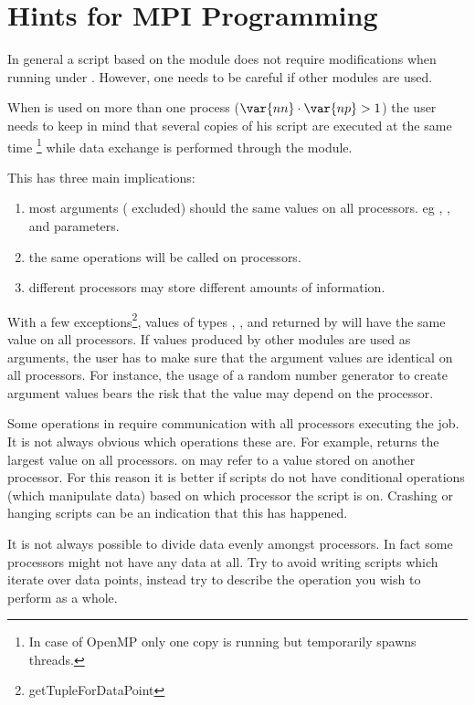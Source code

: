\section{Hints for MPI Programming}
In general a script based on the \escript module does not require modifications when running under \MPI. However, one needs to be careful if other modules are used. 

When \MPI is used on more than one process ($\var{nn} \cdot \var{np} >1$) the user needs to keep in mind that several copies of his script are executed at the same time 
\footnote{In case of OpenMP only one copy is running but \escript temporarily spawns threads.} while data exchange is performed through the \escript module. 

This has three main implications:
\begin{enumerate}
 \item most arguments ( excluded) should the same values on all processors. eg , ,  
and \numpy parameters.
\item the same operations will be called on processors.
\item different processors may store different amounts of information.
\end{enumerate}

With a few exceptions\footnote{getTupleForDataPoint}, values of types , ,  
and \numpy returned by \escript will have the same value on all processors.
If values produced by other modules are used as arguments, the user has to make sure that the argument values are identical
 on all processors. For instance, the usage of a random number generator to create argument values bears the risk that 
the value may depend on the processor. 

Some operations in \escript require communication with all processors executing the job.
It is not always obvious which operations these are.
For example,  returns the largest value on all processors.
 on  may refer to a value stored on another processor.
For this reason it is better if scripts do not have conditional operations (which manipulate data) based on which processor the script is on.
Crashing or hanging scripts can be an indication that this has happened.

It is not always possible to divide data evenly amongst processors.
In fact some processors might not have any data at all.
Try to avoid writing scripts which iterate over data points,
instead try to describe the operation you wish to perform as a whole.

